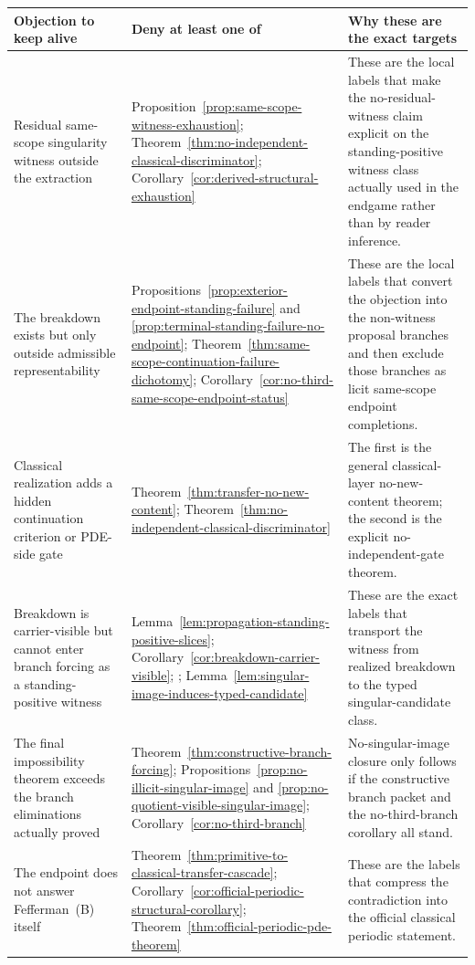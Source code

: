 \begin{center}
\footnotesize
\renewcommand{\arraystretch}{1.16}
\setlength{\tabcolsep}{4pt}
\begin{tabularx}{0.98\textwidth}{@{}L{0.32\textwidth}L{0.31\textwidth}Y@{}}
\toprule
\textbf{Objection to keep alive} & \textbf{Deny at least one of} & \textbf{Why these are the exact targets}\\
\midrule
Residual same-scope singularity witness outside the extraction & Proposition~\ref{prop:same-scope-witness-exhaustion}; Theorem~\ref{thm:no-independent-classical-discriminator}; Corollary~\ref{cor:derived-structural-exhaustion} & These are the local labels that make the no-residual-witness claim explicit on the standing-positive witness class actually used in the endgame rather than by reader inference.\\
The breakdown exists but only outside admissible representability & Propositions~\ref{prop:exterior-endpoint-standing-failure} and \ref{prop:terminal-standing-failure-no-endpoint}; Theorem~\ref{thm:same-scope-continuation-failure-dichotomy}; Corollary~\ref{cor:no-third-same-scope-endpoint-status} & These are the local labels that convert the objection into the non-witness proposal branches and then exclude those branches as licit same-scope endpoint completions.\\
Classical realization adds a hidden continuation criterion or PDE-side gate & Theorem~\ref{thm:transfer-no-new-content}; Theorem~\ref{thm:no-independent-classical-discriminator} & The first is the general classical-layer no-new-content theorem; the second is the explicit no-independent-gate theorem.\\
Breakdown is carrier-visible but cannot enter branch forcing as a standing-positive witness & Lemma~\ref{lem:propagation-standing-positive-slices}; Corollary~\ref{cor:breakdown-carrier-visible}; \HorizonDetectabilityRef{}; Lemma~\ref{lem:singular-image-induces-typed-candidate} & These are the exact labels that transport the witness from realized breakdown to the typed singular-candidate class.\\
The final impossibility theorem exceeds the branch eliminations actually proved & Theorem~\ref{thm:constructive-branch-forcing}; Propositions~\ref{prop:no-illicit-singular-image} and \ref{prop:no-quotient-visible-singular-image}; Corollary~\ref{cor:no-third-branch} & No-singular-image closure only follows if the constructive branch packet and the no-third-branch corollary all stand.\\
The endpoint does not answer Fefferman~(B) itself & Theorem~\ref{thm:primitive-to-classical-transfer-cascade}; Corollary~\ref{cor:official-periodic-structural-corollary}; Theorem~\ref{thm:official-periodic-pde-theorem} & These are the labels that compress the contradiction into the official classical periodic statement.\\
\bottomrule
\end{tabularx}
\end{center}

